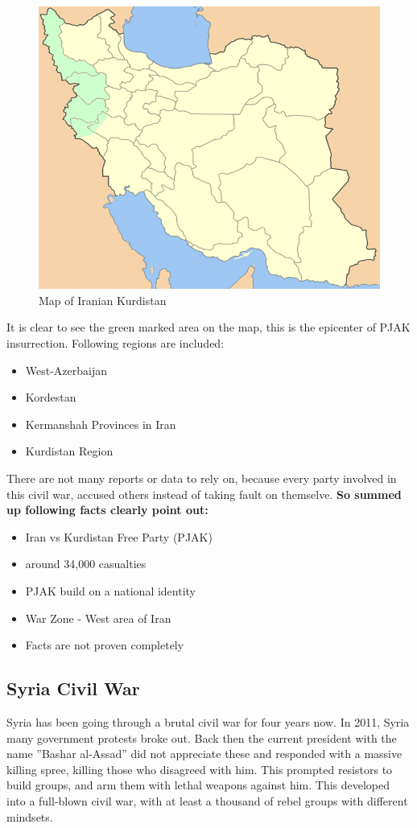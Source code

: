 \begin{figure}[!h]
	\begin{center}
		\includegraphics[width=0.5\linewidth]{images/Map_of_Iranian_Kurdistan}
		\caption{Map of Iranian Kurdistan}
	\end{center}
\end{figure}

It is clear to see the green marked area on the map, this is the epicenter of PJAK insurrection.
Following regions are included:
\begin{itemize}
	\item West-Azerbaijan
	\item Kordestan
	\item Kermanshah Provinces in Iran
	\item Kurdistan Region
\end{itemize}

There are not many reports or data to rely on, because every party involved in this civil war, accused others instead of taking fault on themselve. \textbf{So summed up following facts clearly point out:}

\begin{itemize}
	\item Iran vs Kurdistan Free Party (PJAK)
	\item around 34,000 casualties
	\item PJAK build on a national identity
	\item War Zone - West area of Iran
	\item Facts are not proven completely
\end{itemize}

\subsection{Syria Civil War}
Syria has been going through a brutal civil war for four years now. In 2011, Syria many government protests broke out.
Back then the current president with the name ''Bashar al-Assad'' did not appreciate these and responded with a massive killing spree, killing those who disagreed with him. This prompted resistors to build groups, and arm them with lethal weapons against him. This developed into a full-blown civil war, with at least a thousand of rebel groups with different mindsets.

